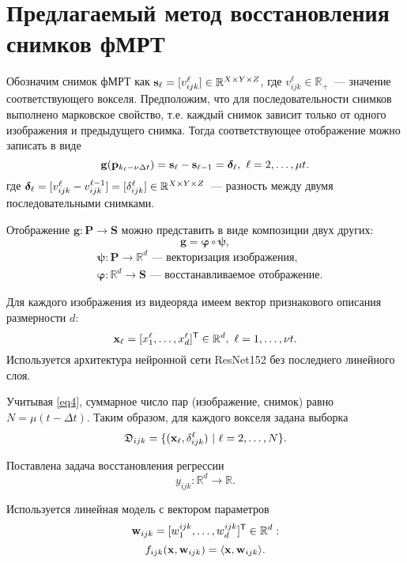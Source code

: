 \documentclass[a4paper, 12pt]{extarticle}
\begin{document}
\section{Предлагаемый метод восстановления снимков фМРТ}

Обозначим снимок фМРТ как $\mathbf{s}_{\ell} = [v^{\ell}_{ijk}] \in \mathbb{R}^{X \times Y \times Z}$,
где $v^{\ell}_{ijk} \in \mathbb{R}_+$~--- значение соответствующего вокселя.
Предположим, что для последовательности снимков выполнено марковское свойство,
т.е. каждый снимок зависит только от одного изображения и предыдущего снимка.
Тогда соответствующее отображение можно записать в виде
\begin{equation}
	\label{eq5}
	\mathbf{g}(\mathbf{p}_{k_{\ell} - \nu \Delta t}) = \mathbf{s}_{\ell} - \mathbf{s}_{\ell-1} = \boldsymbol{\delta}_{\ell}, \ \ell = 2, \ldots, \mu t.
\end{equation}
где $\boldsymbol{\delta}_{\ell} = [v^{\ell}_{ijk} - v^{\ell-1}_{ijk}] = [\delta^{\ell}_{ijk}] \in \mathbb{R}^{X \times Y \times Z}$~--- разность между двумя последовательными снимками.

Отображение $\mathbf{g}: \mathbf{P} \to \mathbf{S}$ можно представить в виде композиции
двух других:
\[ \mathbf{g} = \bm{\varphi} \circ \bm{\psi}, \]
\vspace{-0.8cm}
\begin{align*}
	 & \bm{\psi}: \mathbf{P} \to \mathbb{R}^d
	\text{~--- векторизация изображения,}        \\
	 & \bm{\varphi}: \mathbb{R}^d \to \mathbf{S}
	\text{~--- восстанавливаемое отображение.}
\end{align*}

Для каждого изображения из видеоряда имеем вектор признакового описания размерности $d$:
\[ \mathbf{x}_{\ell} = [x^{\ell}_1, \ldots, x^{\ell}_{d}]^{\mathsf{T}} \in \mathbb{R}^{d}, \ {\ell} = 1, \ldots, \nu t. \]
Используется архитектура нейронной сети ResNet152 без последнего линейного слоя.

Учитывая \eqref{eq4}, суммарное число пар (изображение, снимок)
равно $N = \mu (t - \Delta t)$. Таким образом, для каждого вокселя задана выборка
\[ \mathfrak{D}_{ijk} = \{(\mathbf{x}_{\ell}, \delta^{\ell}_{ijk}) \ | \ {\ell} = 2, \ldots, N \}. \]

Поставлена задача восстановления регрессии
\begin{equation}
	\label{eq6}
	y_{ijk}: \mathbb{R}^{d} \to \mathbb{R}.
\end{equation}

Используется линейная модель с вектором параметров
\[ \mathbf{w}_{ijk} = [w^{ijk}_1, \ldots, w^{ijk}_{d}]^{\mathsf{T}} \in \mathbb{R}^{d}: \]
\begin{equation}
	\label{eq7}
	f_{ijk}(\mathbf{x}, \mathbf{w}_{ijk}) = \langle \mathbf{x}, \mathbf{w}_{ijk} \rangle.
\end{equation}
\end{document}

